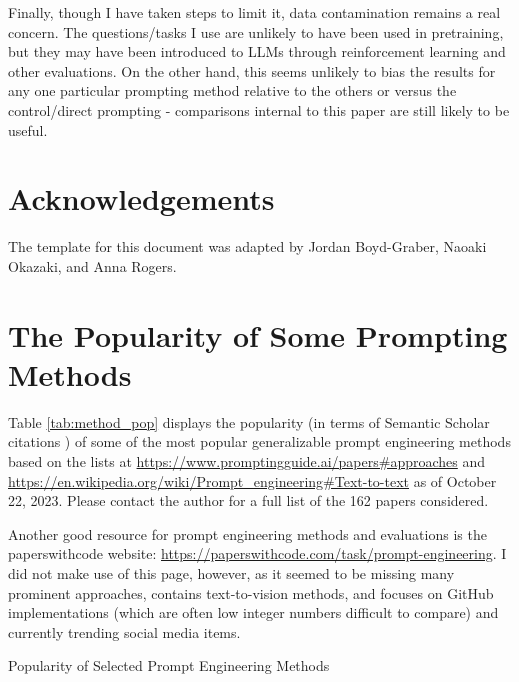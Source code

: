 \documentclass[11pt]{article}
\begin{document}
Finally, though I have taken steps to limit it, data contamination remains a real concern. The questions/tasks I use are unlikely to have been used in pretraining, but they may have been introduced to LLMs through reinforcement learning and other evaluations. On the other hand, this seems unlikely to bias the results for any one particular prompting method relative to the others or versus the control/direct prompting - comparisons internal to this paper are still likely to be useful.

\section*{Acknowledgements}
The template for this document was adapted by Jordan Boyd-Graber, Naoaki Okazaki, and Anna Rogers.




\appendix

\section{The Popularity of Some Prompting Methods}
\label{sec:popularity}

Table \ref{tab:method_pop} displays the popularity (in terms of Semantic Scholar citations \cite{noauthor_semantic_nodate}) of some of the most popular generalizable prompt engineering methods based on the lists at \url{https://www.promptingguide.ai/papers#approaches} and \url{https://en.wikipedia.org/wiki/Prompt_engineering#Text-to-text} as of October 22, 2023. Please contact the author for a full list of the 162 papers considered.

Another good resource for prompt engineering methods and evaluations is the paperswithcode website: \url{https://paperswithcode.com/task/prompt-engineering}. I did not make use of this page, however, as it seemed to be missing many prominent approaches, contains text-to-vision methods, and focuses on GitHub implementations (which are often low integer numbers difficult to compare) and currently trending social media items.

\begin{landscape}

  \begin{centering}

    \begin{table}[h]
      \caption{Popularity of Selected Prompt Engineering Methods}
      \small
      
      \label{tab:method_pop}
    \end{table}

  \end{centering}

\end{landscape}
\end{document}
